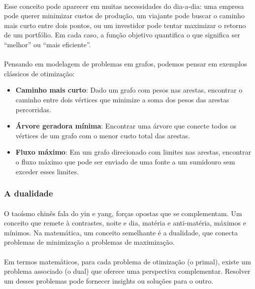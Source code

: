 \documentclass[12pt,a4paper]{article}
\def\emph#1{#1}%
\begin{document}
\paragraph{}
Esse conceito pode aparecer em muitas necessidades do dia-a-dia: uma empresa pode querer minimizar custos de produção, um viajante pode buscar o caminho mais curto entre dois pontos, ou um investidor pode tentar maximizar o retorno de um portfólio. Em cada caso, a função objetivo quantifica o que significa ser “melhor” ou “mais eficiente”.

\paragraph{}
Pensando em modelagem de problemas em grafos, podemos pensar em exemplos clássicos de otimização:

\begin{itemize}
    \item \textbf{Caminho mais curto}: Dado um grafo com pesos nas arestas, encontrar o caminho entre dois vértices que minimize a soma dos pesos das arestas percorridas.
    \item \textbf{Árvore geradora mínima}: Encontrar uma árvore que conecte todos os vértices de um grafo com o menor custo total das arestas.
    \item \textbf{Fluxo máximo}: Em um grafo direcionado com limites nas arestas, encontrar o fluxo máximo que pode ser enviado de uma fonte a um sumidouro sem exceder esses limites.
\end{itemize}

\subsubsection{A dualidade}

\paragraph{}
O taoísmo chinês fala do yin e yang, forças opostas que se complementam. Um conceito que remete à contrastes, noite e dia, matéria e anti-matéria, máximos e mínimos. Na matemática, um conceito semelhante é a \emph{dualidade}, que conecta problemas de minimização a problemas de maximização.

\paragraph{}
Em termos matemáticos, para cada problema de otimização (o \emph{primal}), existe um problema associado (o \emph{dual}) que oferece uma perspectiva complementar. Resolver um desses problemas pode fornecer insights ou soluções para o outro.
\end{document}
